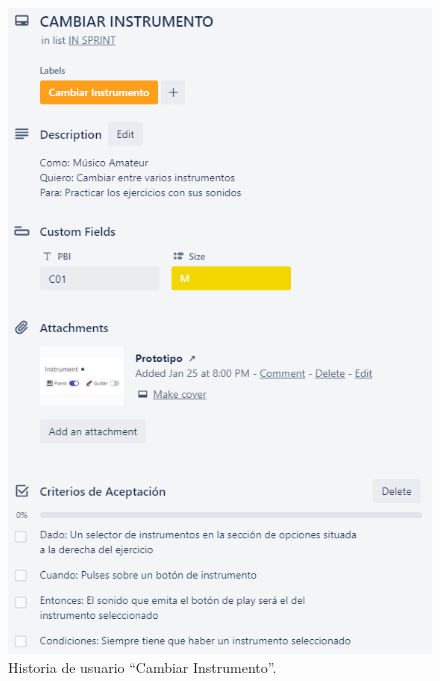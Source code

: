 \documentclass[12pt,twoside,titlepage]{report}
\begin{document}
\begin{figure}[H]
    \centering
    \includegraphics[scale=1.3]{Scrum/User Stories/Instrumentos}
    \caption{Historia de usuario ``Cambiar Instrumento''.}
    \label{fig:Instrumentos}
\end{figure}
\end{document}
